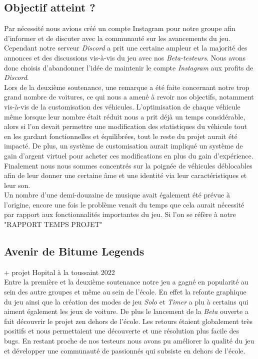 \documentclass[a4paper,12pt]{article}
\begin{document}
        \subsection{Objectif atteint ?}
        Par nécessité nous avions créé un compte Instagram pour notre groupe afin d'informer et de discuter avec la communauté sur les avancements du jeu. Cependant notre serveur \textsl{Discord} a prit une certaine ampleur et la majorité des annonces et des discussions vis-à-vis du jeu avec nos \textsl{Beta-testeurs}. Nous avons donc choisis d'abandonner l'idée de maintenir le compte \textsl{Instagram} aux profits de \textsl{Discord}.\\
        Lors de la deuxième soutenance, une remarque a été faite concernant notre trop grand nombre de voitures, ce qui nous a amené à revoir nos objectifs, notamment vis-à-vis de la customisation des véhicules. L'optimisation de chaque véhicule même lorsque leur nombre était réduit nous a prit déjà un temps considérable, alors si l'on devait permettre une modification des statistiques du véhicule tout en les gardant fonctionnelles et équilibrées, tout le reste du projet aurait été impacté. De plus, un système de customisation aurait impliqué un système de gain d'argent virtuel pour acheter ces modifications en plus du gain d'expérience. Finalement nous nous sommes concentrés sur la poignée de véhicules déblocables afin de leur donner une certaine âme et une identité via leur caractéristiques et leur son.\\
        Un nombre d'une demi-douzaine de musique avait également été prévue à l'origine, encore une fois le problème venait du temps que cela aurait nécessité par rapport aux fonctionnalités importantes du jeu.
        Si l'on se réfère à notre "RAPPORT TEMPS PROJET"
        
    \subsection{Avenir de Bitume Legends}
        + projet Hopital à la toussaint 2022\\
        Entre la première et la deuxième soutenance notre jeu a gagné en popularité au sein des autre groupes et même au sein de l'école. En effet la refonte graphique du jeu ainsi que la création des modes de jeu \textsl{Solo} et \textsl{Timer} a plu à certains qui aiment également les jeux de voiture. De plus le lancement de la \textsl{Beta} ouverte a fait découvrir le projet zen dehors de l'école. Les retours étaient globalement très positifs et nous permettaient une découverte et une résolution plus facile des bugs. En restant proche de nos testeurs nous avons pu améliorer la qualité du jeu et développer une communauté de passionnés qui subsiste en dehors de l'école.
        
\end{document}
